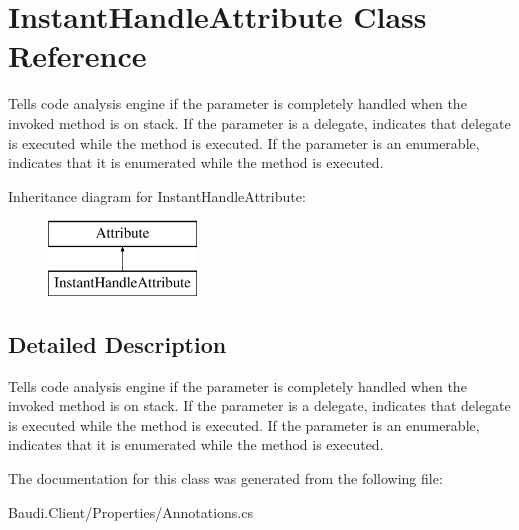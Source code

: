 \hypertarget{class_instant_handle_attribute}{}\section{Instant\+Handle\+Attribute Class Reference}
\label{class_instant_handle_attribute}


Tells code analysis engine if the parameter is completely handled when the invoked method is on stack. If the parameter is a delegate, indicates that delegate is executed while the method is executed. If the parameter is an enumerable, indicates that it is enumerated while the method is executed.  


Inheritance diagram for Instant\+Handle\+Attribute\+:\begin{figure}[H]
\begin{center}
\leavevmode
\includegraphics[height=2.000000cm]{class_instant_handle_attribute}
\end{center}
\end{figure}


\subsection{Detailed Description}
Tells code analysis engine if the parameter is completely handled when the invoked method is on stack. If the parameter is a delegate, indicates that delegate is executed while the method is executed. If the parameter is an enumerable, indicates that it is enumerated while the method is executed. 



The documentation for this class was generated from the following file\+:\begin{DoxyCompactItemize}
\item 
Baudi.\+Client/\+Properties/Annotations.\+cs\end{DoxyCompactItemize}
